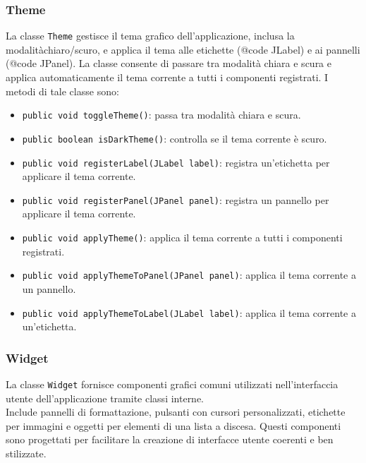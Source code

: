 \subsubsection {Theme}
La classe \texttt{Theme} gestisce il tema grafico dell'applicazione, inclusa la modalitàchiaro/scuro, e applica il tema alle etichette ({@code JLabel}) e ai pannelli ({@code JPanel}).
La classe consente di passare tra modalità chiara e scura e applica automaticamente il tema corrente a tutti i componenti registrati.
I metodi di tale classe sono:
\begin{itemize}
    \item \texttt{public void toggleTheme()}: passa tra modalità chiara e scura.
    \item \texttt{public boolean isDarkTheme()}: controlla se il tema corrente è scuro.
    \item \texttt{public void registerLabel(JLabel label)}: registra un'etichetta per applicare il tema corrente.
    \item \texttt{public void registerPanel(JPanel panel)}: registra un pannello per applicare il tema corrente.
    \item \texttt{public void applyTheme()}: applica il tema corrente a tutti i componenti registrati.
    \item \texttt{public void applyThemeToPanel(JPanel panel)}: applica il tema corrente a un pannello.
    \item \texttt{public void applyThemeToLabel(JLabel label)}: applica il tema corrente a un'etichetta.
\end{itemize}

\subsubsection {Widget}
La classe \texttt{Widget} fornisce componenti grafici comuni utilizzati nell'interfaccia utente dell'applicazione tramite classi interne.\\
Include pannelli di formattazione, pulsanti con cursori personalizzati, etichette per immagini e oggetti per elementi di una lista a discesa. 
Questi componenti sono progettati per facilitare la creazione di interfacce utente coerenti e ben stilizzate.

